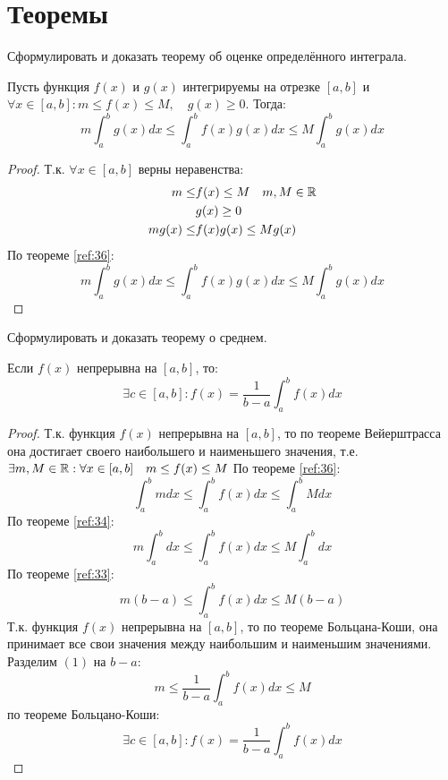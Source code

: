 \section{Теоремы}

\begin{question}
	Сформулировать и доказать теорему об оценке определённого интеграла.
\end{question}
\begin{theorem}
  \label{th:39}
  Пусть функция $f(x)$ и $g(x)$ интегрируемы на отрезке $[a, b]$ и  $\forall x \in [a, b] : m \le f(x) \le M, \quad g(x) \ge 0$.
  Тогда: \[
    m \int_a^b g(x) dx \le \int_a^b f(x) g(x) dx \le M \int_a^b g(x) dx
  \]
\end{theorem}

\begin{proof}
  Т.к. $\forall x \in [a, b]$ верны неравенства:
  \begin{align*}
    m \le  &f(x) \le M \quad m, M \in \mathbb{R} \\
         &g(x) \ge 0 \\
    mg(x) \le &f(x)g(x) \le M g(x)
  \end{align*}
  По теореме \ref{ref:36}: \[
    m \int_a^b g(x) dx \le \int_a^b f(x) g(x) dx \le M \int_a^b g(x) dx
  \] 
\end{proof}


\begin{question}
	Сформулировать и доказать теорему о среднем.
\end{question}
\begin{theorem}
  Если $f(x)$ непрерывна на $[a, b]$, то: \[
    \exists c \in [a, b] : f(x) = \frac{1}{b - a} \int_a^b f(x) dx
  \] 
\end{theorem}
\begin{proof}
  Т.к. функция $f(x)$ непрерывна на $[a, b]$, то по теореме Вейерштрасса она достигает своего наибольшего и наименьшего значения, т.е. $\exists m, M \in \mathbb{R} : \forall x \in [a, b] \quad m \le f(x) \le M$
  По теореме \ref{ref:36}:  \[
  \int_a^b mdx \le \int_a^b f(x) dx \le \int_a^b Mdx
  \] 
  По теореме \ref{ref:34}: \[
    m \int_a^b dx \le \int_a^b f(x) dx \le M \int_a^b dx
  \]
  По теореме \ref{ref:33}: \[
    m(b - a) \le \int_a^b f(x) dx \le M(b - a) \tag{1} 
  \] 
  Т.к. функция $f(x)$ непрерывна на  $[a, b]$, то по теореме Больцана-Коши, она принимает все свои значения между наибольшим и наименьшим значениями. Разделим $(1)$ на  $b - a$:  \[
  m \le \frac{1}{b - a} \int_a^b f(x) dx \le M
  \] 
  по теореме Больцано-Коши: \[
    \exists c \in [a, b] : f(x) = \frac{1}{b - a} \int_a^b f(x) dx
  \]
\end{proof}


